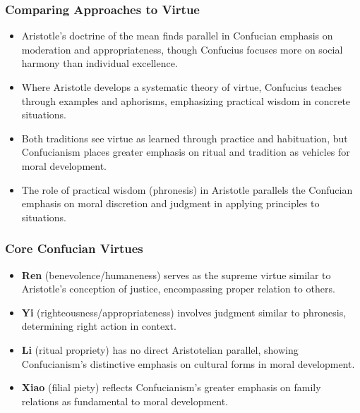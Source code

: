 \documentclass{beamer}
\begin{document}
\begin{frame}
    \frametitle{Comparing Approaches to Virtue}
    \begin{itemize}
        \item Aristotle's doctrine of the mean finds parallel in Confucian emphasis on moderation and appropriateness, though Confucius focuses more on social harmony than individual excellence.
        
        \item Where Aristotle develops a systematic theory of virtue, Confucius teaches through examples and aphorisms, emphasizing practical wisdom in concrete situations.
        
        \item Both traditions see virtue as learned through practice and habituation, but Confucianism places greater emphasis on ritual and tradition as vehicles for moral development.
        
        \item The role of practical wisdom (phronesis) in Aristotle parallels the Confucian emphasis on moral discretion and judgment in applying principles to situations.
    \end{itemize}
\end{frame}

\begin{frame}
    \frametitle{Core Confucian Virtues}
    \begin{itemize}
        \item \textbf{Ren} (benevolence/humaneness) serves as the supreme virtue similar to Aristotle's conception of justice, encompassing proper relation to others.
        
        \item \textbf{Yi} (righteousness/appropriateness) involves judgment similar to phronesis, determining right action in context.
        
        \item \textbf{Li} (ritual propriety) has no direct Aristotelian parallel, showing Confucianism's distinctive emphasis on cultural forms in moral development.
        
        \item \textbf{Xiao} (filial piety) reflects Confucianism's greater emphasis on family relations as fundamental to moral development.
    \end{itemize}
\end{frame}
\end{document}
